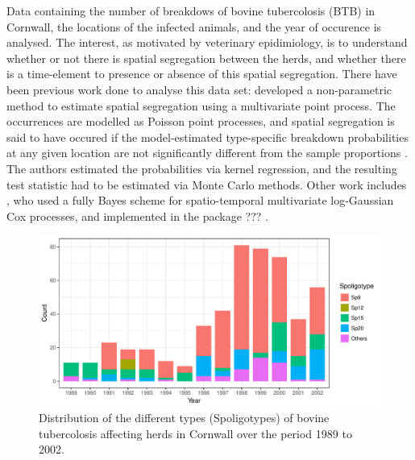 \documentclass[a4paper,showframe,11pt]{report}\usepackage[]{graphicx}\usepackage[]{color}
\makeatletter
\newenvironment{kframe}{%
 \def\at@end@of@kframe{}%
 \ifinner\ifhmode%
  \def\at@end@of@kframe{\end{minipage}}%
  \begin{minipage}{\columnwidth}%
 \fi\fi%
 \def\FrameCommand##1{\hskip\@totalleftmargin \hskip-\fboxsep
 \colorbox{shadecolor}{##1}\hskip-\fboxsep
     \hskip-\linewidth \hskip-\@totalleftmargin \hskip\columnwidth}%
 \MakeFramed {\advance\hsize-\width
   \@totalleftmargin\z@ \linewidth\hsize
   \@setminipage}}%
 {\par\unskip\endMakeFramed%
 \at@end@of@kframe}
\newenvironment{knitrout}{}{} %
\makeatother
\begin{document}
Data containing the number of breakdows of bovine tubercolosis (BTB) in Cornwall, the locations of the infected animals, and the year of occurence is analysed.
The interest, as motivated by veterinary epidimiology, is to understand whether or not there is spatial segregation between the herds, and whether there is a time-element to presence or absence of this spatial segregation.
There have been previous work done to analyse this data set: \cite{diggle2005nonparametric} developed a non-parametric method to estimate spatial segregation using a multivariate point process.
The occurrences are modelled as Poisson point processes, and spatial segregation is said to have occured if the model-estimated type-specific breakdown probabilities at any given location are not significantly different from the sample proportions .
The authors estimated the probabilities via kernel regression, and the resulting test statistic had to be estimated via Monte Carlo methods.
Other work includes \citet{diggle2013spatial}, who used a fully Bayes scheme for spatio-temporal multivariate log-Gaussian Cox processes, and implemented in the  package ??? \citep{taylor2013lgcp}.

\begin{knitrout}
\color{fgcolor}\begin{kframe}
\singlespacing\end{kframe}\begin{figure}[h]

{\centering \includegraphics[width=\linewidth]{figure/05-plot_cow-1} 

}

\caption[Distribution of the different types (Spoligotypes) of bovine tubercolosis affecting herds in Cornwall over the period 1989 to 2002]{Distribution of the different types (Spoligotypes) of bovine tubercolosis affecting herds in Cornwall over the period 1989 to 2002.}\label{fig:plot.cow}
\end{figure}


\end{knitrout}
\end{document}
